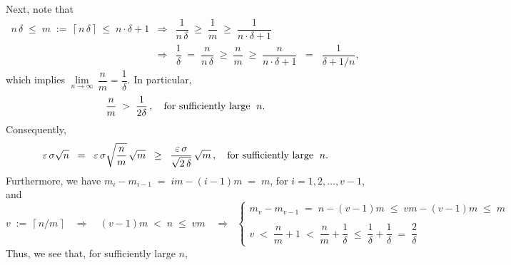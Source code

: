 Next, note that
\begin{eqnarray*}
n\,\delta \;\leq\; m \;:=\; \lceil\,n\,\delta\,\rceil \;\leq\; n\cdot\delta + 1
&\Longrightarrow&
	\dfrac{1}{n\,\delta} \;\geq\; \dfrac{1}{m} \;\geq\; \dfrac{1}{n\cdot\delta + 1}
\\
&\Longrightarrow&
	\dfrac{1}{\delta} \;=\; \dfrac{n}{n\,\delta} \;\geq\; \dfrac{n}{m} \;\geq\; \dfrac{n}{n\cdot\delta + 1}
	\;\;=\;\; \dfrac{1}{\delta + 1/n},
\end{eqnarray*}
which implies $\underset{n\rightarrow\infty}{\lim}\,\dfrac{n}{m} = \dfrac{1}{\delta}$.
In particular,
\begin{eqnarray*}
	\dfrac{n}{m} \;>\; \dfrac{1}{2\delta}\,,
	\quad\textnormal{for sufficiently large \;$n$}.
\end{eqnarray*}
Consequently,
\begin{equation*}
\varepsilon\,\sigma\sqrt{n}
\;\; = \;\;
	\varepsilon\,\sigma\sqrt{\dfrac{n}{m}}\,\sqrt{m}
\;\; \geq \;\;
	\dfrac{\varepsilon\,\sigma}{\sqrt{2\,\delta}}\,\sqrt{m}\,,
	\quad\textnormal{for sufficiently large \;$n$}.
\end{equation*}
Furthermore, we have
\;$m_{i} - m_{i-1} \;=\; im - (i-1)m \;=\; m$,\; for $i = 1, 2, \ldots, v-1$,\; and
\begin{equation*}
v \;:=\; \lceil\,n/m\,\rceil
\quad\Longrightarrow\quad
	(v-1)m \;<\; n \;\leq\; vm
\quad\Longrightarrow\;\;
	\left\{\begin{array}{l}
		m_{v} - m_{v-1} \;=\; n - (v-1)m \;\leq\; vm - (v-1)m \;\leq\; m
		\\ \\
		v \;<\; \dfrac{n}{m} + 1 \;<\; \dfrac{n}{m} + \dfrac{1}{\delta} \;\leq\; \dfrac{1}{\delta} + \dfrac{1}{\delta} \;=\; \dfrac{2}{\delta}
	\end{array}\right.
\end{equation*}
Thus, we see that, for sufficiently large $n$,

